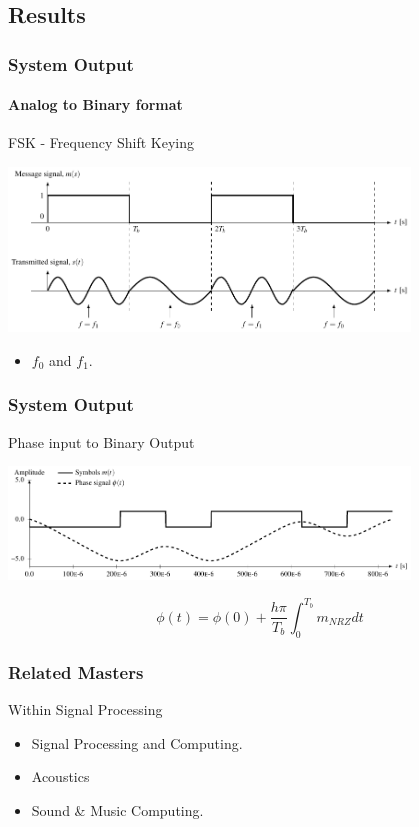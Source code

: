 \subsection{Results}
\begin{frame} \frametitle{System Output}
    \framesubtitle{Analog to Binary format}
    \begin{block}{FSK - Frequency Shift Keying}    
        \begin{center}
            \includegraphics[width=0.8\textwidth]{img/gfsk_basics}
        \end{center}
        \begin{itemize}
            \item $f_0$ and $f_1$.
        \end{itemize}
    \end{block}
\end{frame}
%
\begin{frame}\frametitle{System Output}
    \begin{block}{Phase input to Binary Output} 
        \begin{center}
            \includegraphics[width=0.8\textwidth]{img/gfsk_integration} 
        \end{center}
        \begin{equation}
            \phi(t) = \phi(0) + \frac{h \pi}{T_b}\int_0^{T_b} m_{NRZ}dt
        \end{equation}
    \end{block}
\end{frame}


\begin{frame}\frametitle{Related Masters}
    \begin{block}{Within Signal Processing} 
     \begin{itemize}
         \item Signal Processing and Computing.
         \item Acoustics
         \item Sound \& Music Computing.
     \end{itemize}
    \end{block}
\end{frame}

